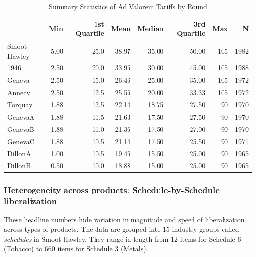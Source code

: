 \documentclass[
  12pt,
]{article}
\begin{document}
\begin{table}[!h]

\caption{\label{tab:av-sm-db}Summary Statistics of Ad Valorem Tariffs by Round}
\centering
\begin{tabular}[t]{lrrrrrrr}
\toprule
  & Min & 1st Quartile & Mean & Median & 3rd Quartile & Max & N\\
\midrule
Smoot Hawley & 5.00 & 25.0 & 38.97 & 35.00 & 50.00 & 105 & 1982\\
1946 & 2.50 & 20.0 & 33.95 & 30.00 & 45.00 & 105 & 1988\\
Geneva & 2.50 & 15.0 & 26.46 & 25.00 & 35.00 & 105 & 1972\\
Annecy & 2.50 & 12.5 & 25.56 & 20.00 & 33.33 & 105 & 1972\\
Torquay & 1.88 & 12.5 & 22.14 & 18.75 & 27.50 & 90 & 1970\\
\addlinespace
GenevaA & 1.88 & 11.5 & 21.63 & 17.50 & 27.50 & 90 & 1970\\
GenevaB & 1.88 & 11.0 & 21.36 & 17.50 & 27.00 & 90 & 1970\\
GenevaC & 1.88 & 10.5 & 21.14 & 17.50 & 25.50 & 90 & 1971\\
DillonA & 1.00 & 10.5 & 19.46 & 15.50 & 25.00 & 90 & 1965\\
DillonB & 0.50 & 10.0 & 18.88 & 15.00 & 25.00 & 90 & 1965\\
\bottomrule
\end{tabular}
\end{table}

\hypertarget{heterogeneity-across-products-schedule-by-schedule-liberalization}{%
\subsubsection{Heterogeneity across products: Schedule-by-Schedule liberalization}\label{heterogeneity-across-products-schedule-by-schedule-liberalization}}

These headline numbers hide variation in magnitude and speed of liberalization across types of products. The data are grouped into 15 industry groups called \emph{schedules} in Smoot Hawley. They range in length from 12 items for Schedule 6 (Tobacco) to 660 items for Schedule 3 (Metals).
\end{document}
